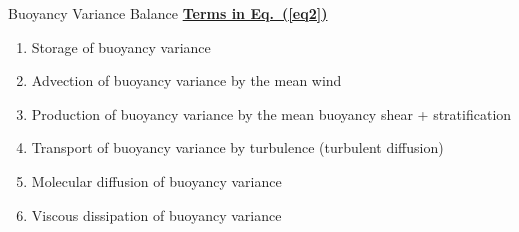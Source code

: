 \begin{frame}{Buoyancy Variance Balance}
\textbf{\underline{Terms in Eq.~(\ref{eq2})}}
\begin{enumerate}
	\item Storage of buoyancy variance
	\item Advection of buoyancy variance by the mean wind
	\item Production of buoyancy variance by the mean buoyancy shear + stratification
	\item Transport of buoyancy variance by turbulence (turbulent diffusion)
	\item Molecular diffusion of buoyancy variance
	\item Viscous dissipation of buoyancy variance

\end{enumerate}
\end{frame}


